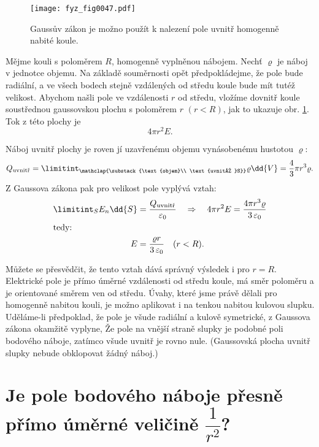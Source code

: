   \begin{figure}[ht!]  %
    \centering
    \texttt{[image: fyz\_fig0047.pdf]}
    \caption{Gaussův zákon je možno použít k nalezení pole uvnitř homogenně nabité koule.}
    \label{fyz:fig0047}
  \end{figure}
  Mějme kouli s poloměrem \(R\), homogenně vyplněnou nábojem. Nechť \(\varrho\) je náboj v jednotce
  objemu. Na základě souměrnosti opět předpokládejme, že pole bude radiální, a ve všech bodech
  stejně vzdálených od středu koule bude mít tutéž velikost. Abychom našli pole ve vzdálenosti \(r\)
  od středu, vložíme dovnitř koule soustřednou gaussovskou plochu s poloměrem \(r\) \((r< R)\), jak
  to ukazuje obr. \ref{fyz:fig0047}. Tok z této plochy je 
  \[4\pi r^2E.\]

  Náboj uvnitř plochy je roven jí uzavřenému objemu vynásobenému hustotou \(\varrho\):
  \begin{equation}\label{fyz:eq_fey_elstat_gauss05} 
    Q_{\text{uvnitř}} 
            = \limitint_{\mathclap{\substack{\text{objem}\\
                                             \text{uvnitř }S}}} \varrho\dd{V} 
            = \frac{4}{3}\pi r^3\varrho.           
  \end{equation}
  Z Gaussova zákona pak pro velikost pole vyplývá vztah:
  \begin{align}      
   \limitint_S E_n\dd{S}
      &= \frac{Q_{\text{uvnitř}}}{\varepsilon_0} 
            \quad\Rightarrow\quad 4\pi r^2E 
            = \frac{4\pi r^3\varrho}{3\,\varepsilon_0}  \label{fyz:eq_fey_elstat_gauss06} \\ 
   \shortintertext{tedy:}
   E  &= \frac{\varrho r}{3\,\varepsilon_0} \quad (r<R).
  \end{align}
  
  Můžete se přesvědčit, že tento vztah dává správný výsledek i pro \(r=R\). Elektrické pole je přímo
  úměrné vzdálenosti od středu koule, má směr poloměru a je orientované směrem ven od středu. Úvahy,
  které jsme právě dělali pro homogenně nabitou kouli, je možno aplikovat i na tenkou nabitou
  kulovou slupku. Uděláme-li předpoklad, že pole je všude radiální a kulově symetrické, z Gaussova
  zákona okamžitě vyplyne, Že pole na vnější straně slupky je podobné poli bodového náboje, zatímco
  všude uvnitř je rovno nule. (Gaussovská plocha uvnitř slupky nebude obklopovat žádný náboj.)
  
\section{Je pole bodového náboje přesně přímo úměrné veličině 
             \texorpdfstring{\fontsize{8pt}{9pt}\selectfont\(\dfrac{1}{r^2}\)}{1/r^2}?}\label{fyz:IIchapVsecVII}
              

